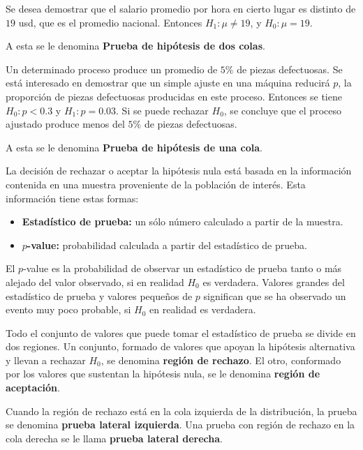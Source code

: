 \begin{Ejem}
Se desea demostrar que el salario promedio por hora en cierto lugar es distinto de $19$ usd, que es el promedio nacional. Entonces $H_{1}:\mu \neq 19$, y $H_{0}:\mu = 19$.
\end{Ejem}
A esta se le denomina \textbf{Prueba de hipótesis de dos colas}.

\begin{Ejem}
Un determinado proceso produce un promedio de $5\%$ de piezas defectuosas. Se está interesado en demostrar que un simple ajuste en una máquina reducirá $p$, la proporción de piezas defectuosas producidas en este proceso. Entonces se tiene $H_{0}: p < 0.3$ y $H_{1}: p = 0.03$. Si se puede rechazar $H_{0}$, se concluye que el proceso ajustado produce menos del $5\%$ de piezas defectuosas.
\end{Ejem}
A esta se le denomina \textbf{Prueba de hipótesis de una cola}.

La decisión de rechazar o aceptar la hipótesis nula está basada en la información contenida en una muestra proveniente de la población de interés. Esta información tiene estas formas:
\begin{itemize}
    \item \textbf{Estadístico de prueba:} un sólo número calculado a partir de la muestra.
    \item \textbf{$p$-value:} probabilidad calculada a partir del estadístico de prueba.
\end{itemize}

\begin{Def}
El $p$-value es la probabilidad de observar un estadístico de prueba tanto o más alejado del valor observado, si en realidad $H_{0}$ es verdadera.\medskip
Valores grandes del estadístico de prueba y valores pequeños de $p$ significan que se ha observado un evento muy poco probable, si $H_{0}$ en realidad es verdadera.
\end{Def}
Todo el conjunto de valores que puede tomar el estadístico de prueba se divide en dos regiones. Un conjunto, formado de valores que apoyan la hipótesis alternativa y llevan a rechazar $H_{0}$, se denomina \textbf{región de rechazo}. El otro, conformado por los valores que sustentan la hipótesis nula, se le denomina \textbf{región de aceptación}.\medskip

Cuando la región de rechazo está en la cola izquierda de la distribución, la prueba se denomina \textbf{prueba lateral izquierda}. Una prueba con región de rechazo en la cola derecha se le llama \textbf{prueba lateral derecha}.\medskip

